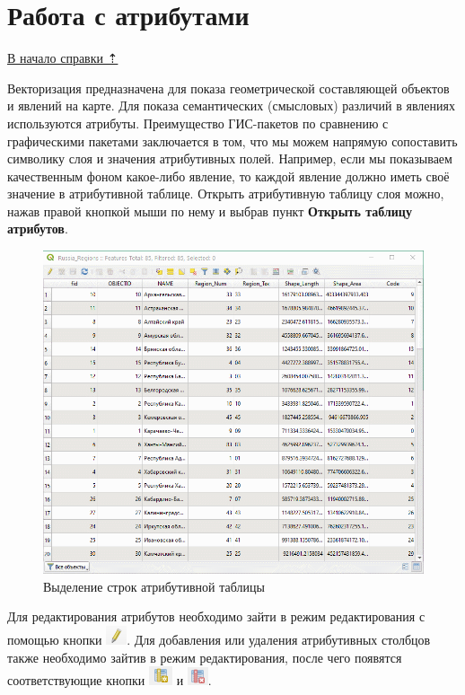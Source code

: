 \documentclass[
  12pt,
]{book}
\begin{document}
\section{Работа с атрибутами}\label{digitize-attributes}

\hyperref[digitize]{В начало справки ⇡}

Векторизация предназначена для показа геометрической составляющей объектов и явлений на карте. Для показа семантических (смысловых) различий в явлениях используются атрибуты. Преимущество ГИС-пакетов по сравнению с графическими пакетами заключается в том, что мы можем напрямую сопоставить символику слоя и значения атрибутивных полей. Например, если мы показываем качественным фоном какое-либо явление, то каждой явление должно иметь своё значение в атрибутивной таблице. Открыть атрибутивную таблицу слоя можно, нажав правой кнопкой мыши по нему и выбрав пункт \textbf{Открыть таблицу атрибутов}.

\begin{figure}
\centering
\includegraphics{images/vector/Attribute_table.gif}
\caption{Выделение строк атрибутивной таблицы}
\end{figure}

Для редактирования атрибутов необходимо зайти в режим редактирования с помощью кнопки \includegraphics{images/vector/Edit.png}. Для добавления или удаления атрибутивных столбцов также необходимо зайтив в режим редактирования, после чего появятся соответствующие кнопки \includegraphics{images/vector/New_field.png} и \includegraphics{images/vector/Delete_field.png}.
\end{document}
